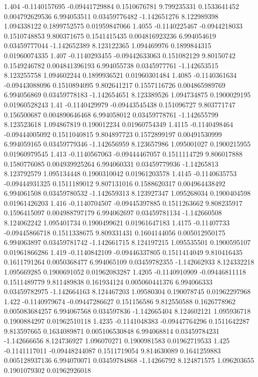 {1.404 -0.1140157695 -0.09441729884 0.1510676781 9.799235331 0.1533641452 0.004792629536 6.994053511 0.03459776482 -1.142651276 8.122989398 1.094338122 0.1899752575 0.01959847066
1.4055 -0.1140225467 -0.0944218033 0.1510748853 9.800371675 0.1541415435 0.004816923236 6.994054619 0.03459777044 -1.142652389 8.123122365 1.094469976 0.1899844315 0.01960074335
1.407 -0.1140293455 -0.09442633063 0.151082129 9.80150742 0.1549246782 0.004841396193 6.994055738 0.0345977761 -1.142653515 8.123255758 1.094602244 0.1899936521 0.01960301484
1.4085 -0.1140361634 -0.09443088096 0.1510894095 9.802641217 0.1557116726 0.004865989769 6.994056869 0.03459778183 -1.142654651 8.123389526 1.094734875 0.1900029195 0.01960528243
1.41 -0.1140429979 -0.09443545438 0.151096727 9.803771747 0.156500687 0.004890646468 6.994058012 0.03459778761 -1.142655799 8.123523618 1.094867819 0.190012234 0.01960754349
1.4115 -0.1140498464 -0.09444005092 0.1511040815 9.804897723 0.1572899197 0.00491530999 6.994059165 0.03459779346 -1.142656959 8.123657986 1.095001027 0.1900215955 0.01960979545
1.413 -0.1140567063 -0.09444467057 0.1511114729 9.806017888 0.1580776085 0.004939925264 6.994060331 0.03459779936 -1.14265813 8.123792579 1.095134448 0.1900310042 0.01961203578
1.4145 -0.1140635753 -0.09444931325 0.1511189012 9.807131016 0.1588620317 0.004964438492 6.994061508 0.03459780532 -1.142659313 8.123927347 1.095268034 0.1900404598 0.01961426203
1.416 -0.1140704507 -0.09445397885 0.1511263662 9.808235917 0.1596415097 0.004988797179 6.994062697 0.03459781134 -1.142660508 8.124062242 1.095401734 0.1900499621 0.01961647183
1.4175 -0.11407733 -0.09445866718 0.1511338675 9.809331431 0.1604144056 0.005012950175 6.994063897 0.03459781742 -1.142661715 8.124197215 1.095535501 0.1900595107 0.01961866286
1.419 -0.1140842109 -0.09446337805 0.1511414049 9.810416435 0.1611791264 0.0050368477 6.994065109 0.03459782355 -1.142662933 8.124332218 1.095669285 0.1900691052 0.01962083287
1.4205 -0.1140910909 -0.09446811118 0.1511489779 9.811489838 0.161934124 0.005060441376 6.994066333 0.03459782975 -1.142664163 8.124467203 1.09580304 0.190078745 0.01962297968
1.422 -0.1140979674 -0.09447286627 0.151156586 9.812550588 0.1626778962 0.005083684257 6.994067568 0.034597836 -1.142665404 8.124602121 1.095936718 0.1900884297 0.01962510118
1.4235 -0.1141048383 -0.09447764296 0.1511642287 9.813597665 0.1634089871 0.005106530848 6.994068814 0.03459784231 -1.142666656 8.124736927 1.096070271 0.1900981583 0.01962719533
1.425 -0.1141117011 -0.09448244087 0.1511719054 9.814630089 0.1641259883 0.005128937136 6.994070071 0.03459784868 -1.14266792 8.124871575 1.096203655 0.1901079302 0.01962926018
}
